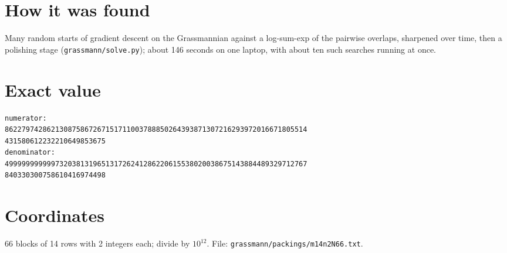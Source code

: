 \documentclass[11pt,a4paper]{article}
\begin{document}
\section{How it was found}
Many random starts of gradient descent on the Grassmannian against a log-sum-exp of the pairwise overlaps, sharpened over time, then a polishing stage (\texttt{grassmann/solve.py}); about 146 seconds on one laptop, with about ten such searches running at once.


\appendix
\section{Exact value}
{\small
\begin{verbatim}
numerator:
862279742862130875867267151711003788850264393871307216293972016671805514
431580612232210649853675
denominator:
499999999999732038131965131726241286220615538020038675143884489329712767
840330300758610416974498
\end{verbatim}}

\section{Coordinates}
66 blocks of 14 rows with 2 integers each; divide by $10^{12}$. File: \texttt{grassmann/packings/m14n2N66.txt}.
{\tiny
\begin{multicols}{4}
\end{multicols}}
\end{document}
